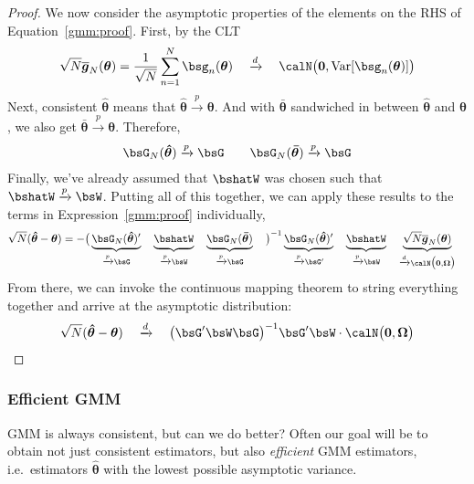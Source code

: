 \documentclass[12pt]{article}
\theoremstyle{plain}
\theoremstyle{definition}
\theoremstyle{remark}
\newcommand{\bstheta}{\boldsymbol{\theta}}
\newcommand{\bsOmega}{\boldsymbol{\Omega}}
\newcommand{\bshattheta}{\boldsymbol{\hat{\theta}}}
\newcommand{\bsbartheta}{\boldsymbol{\bar{\theta}}}
\newcommand{\bsbarg}{\boldsymbol{\overline{g}}}
\renewcommand{\bso}{\boldsymbol{0}}
\newcommand{\Var}{\operatorname{Var}}
\newcommand{\pto}{\xrightarrow{p}}
\newcommand{\dto}{\xrightarrow{d}}
\newcommand{\sumnN}{\sum^N_{n=1}}
\begin{document}
\begin{proof}
We now consider the asymptotic properties of the elements on the RHS of
Equation~\ref{gmm:proof}. First, by the CLT
\begin{align*}
  \sqrt{N}
  \bsbarg_N(\bstheta)
  =
  \frac{1}{\sqrt{N}}
  \sumnN
  \bsg_n(\bstheta)
  \quad\dto\quad
  \calN\big(\bso,\Var[\bsg_n(\bstheta)]\big)
\end{align*}
Next, consistent $\bshattheta$ means that $\bshattheta\pto\bstheta$. And
with $\bsbartheta$ sandwiched in between $\bshattheta$ and $\bstheta$,
we also get $\bsbartheta\pto\bstheta$. Therefore,
\begin{align*}
  \bsG_N(\bshattheta)
  \pto \bsG
  \qquad
  \bsG_N(\bsbartheta)
  \pto \bsG
\end{align*}
Finally, we've already assumed that $\bshatW$ was chosen such that
$\bshatW\pto \bsW$. Putting all of this together, we can apply these
results to the terms in Expression~\ref{gmm:proof} individually,
\begin{align*}
  \sqrt{N}(\bshattheta-\bstheta)
  &=
  -
  \big(
  \underbrace{%
    \bsG_N(\bshattheta)'
  }_{%
    \pto \bsG
  }
  \quad
  \underbrace{%
    \bshatW
    \vphantom{\bsG(\bshattheta)'}
  }_{%
    \pto\bsW
  }
  \quad
  \underbrace{%
    \bsG_N(\bsbartheta)
  }_{%
    \pto \bsG
    \vphantom{\bsG(\bshattheta)'}
  }
  \quad
  \big)^{-1}
  \underbrace{%
    \bsG_N(\bshattheta)'
  }_{%
    \pto \bsG'
    \vphantom{\bsG(\bshattheta)'}
  }
  \quad
  \underbrace{%
    \bshatW
    \vphantom{\bsG(\bshattheta)'}
  }_{%
    \pto\bsW
  }
  \quad
  \underbrace{%
  \sqrt{N}
  \bsbarg_N(\bstheta)
  }_{\dto\calN\big(\bso,\bsOmega\big)}
\end{align*}
From there, we can invoke the continuous mapping theorem to string
everything together and arrive at the asymptotic distribution:
\begin{align*}
  \sqrt{N}(\bshattheta-\bstheta)
  \quad\dto\quad
  \big( \bsG' \bsW \bsG\big)^{-1}
  \bsG' \bsW
  \cdot
  \calN\big(\bso,\bsOmega\big)
\end{align*}
\end{proof}


\clearpage
\subsubsection{Efficient GMM}

GMM is always consistent, but can we do better?
Often our goal will be to obtain not just consistent estimators, but
also \emph{efficient} GMM estimators, i.e.\ estimators $\bshattheta$
with the lowest possible asymptotic variance.
\end{document}
